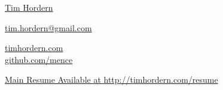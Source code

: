 \documentclass[$fontsize$, a4paper]{article}
\begin{document}
{\LARGE{\href{http://timhordern.com/resume.pdf}{Tim Hordern}}}\\[.2cm]

\begin{multicols}{2}

\vspace{-10pt}

\href{mailto:tim.hordern@gmail.com}{tim.hordern@gmail.com}\\

\columnbreak

\href{http://timhordern.com}{timhordern.com}\\
\href{http://github.com/mence}{github.com/mence}\\
\end{multicols}

\href{http://timhordern.com/resume.pdf}{Main Resume Available at http://timhordern.com/resume}\\[.2cm]
\vspace{-5pt}
\end{document}
